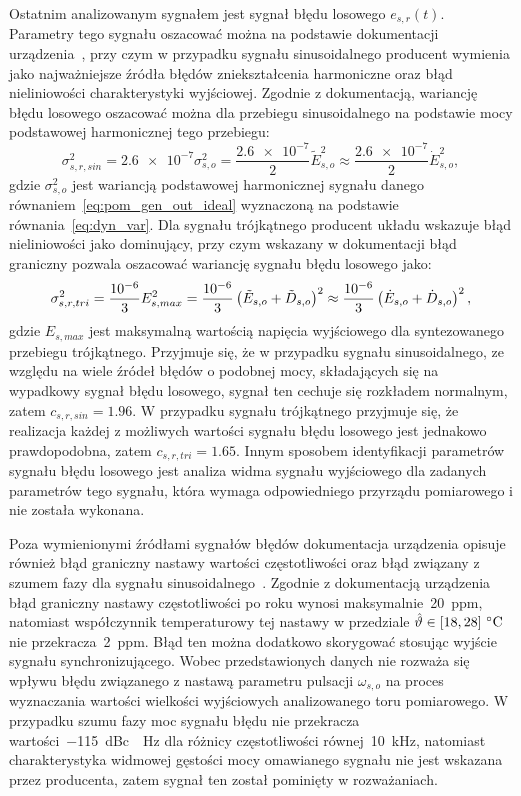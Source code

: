 Ostatnim analizowanym sygnałem jest sygnał błędu losowego $e_{s,r}(t)$. Parametry tego sygnału oszacować można na podstawie dokumentacji urządzenia~\cite{rigol_fawg}, przy czym w przypadku sygnału sinusoidalnego producent wymienia jako najważniejsze źródła błędów zniekształcenia harmoniczne oraz błąd nieliniowości charakterystyki wyjściowej. Zgodnie z dokumentacją, wariancję błędu losowego oszacować można dla przebiegu sinusoidalnego na podstawie mocy podstawowej harmonicznej tego przebiegu:
\begin{equation}
\sigma_{s,r,sin}^{2} = \num{2.6e-7} \sigma_{s,o}^{2} = \frac{\num{2.6e-7}}{2} \tilde{E}_{s,o}^{2} \approx \frac{\num{2.6e-7}}{2} \dot{E}_{s,o}^{2} \label{eq:pom_gen_var_rand_sin},
\end{equation}
gdzie $\sigma_{s,o}^{2}$ jest wariancją podstawowej harmonicznej sygnału danego równaniem~\eqref{eq:pom_gen_out_ideal} wyznaczoną na podstawie równania~\eqref{eq:dyn_var}. Dla sygnału trójkątnego producent układu wskazuje błąd nieliniowości jako dominujący, przy czym wskazany w dokumentacji błąd graniczny pozwala oszacować wariancję sygnału błędu losowego jako:
\begin{equation}
\sigma_{s,r,tri}^{2} = \frac{\num{e-6}}{3} E_{s,max}^{2} = \frac{\num{e-6}}{3} \left(\tilde{E}_{s,o} + \tilde{D}_{s,o}\right)^{2} \approx \frac{\num{e-6}}{3} \left(\dot{E}_{s,o} + \dot{D}_{s,o}\right)^{2} \label{eq:pom_gen_var_rand_saw},
\end{equation}
gdzie $E_{s,max}$ jest maksymalną wartością napięcia wyjściowego dla syntezowanego przebiegu trójkątnego. Przyjmuje się, że w przypadku sygnału sinusoidalnego, ze względu na wiele źródeł błędów o podobnej mocy, składających się na wypadkowy sygnał błędu losowego, sygnał ten cechuje się rozkładem normalnym, zatem $c_{s,r,sin} = \num{1.96}$. W przypadku sygnału trójkątnego przyjmuje się, że realizacja każdej z możliwych wartości sygnału błędu losowego jest jednakowo prawdopodobna, zatem $c_{s,r,tri} = \num{1.65}$. Innym sposobem identyfikacji parametrów sygnału błędu losowego jest analiza widma sygnału wyjściowego dla zadanych parametrów tego sygnału, która wymaga odpowiedniego przyrządu pomiarowego i nie została wykonana.

Poza wymienionymi źródłami sygnałów błędów dokumentacja urządzenia opisuje również błąd graniczny nastawy wartości częstotliwości oraz błąd związany z szumem fazy dla sygnału sinusoidalnego~\cite{rigol_fawg}. Zgodnie z dokumentacją urządzenia błąd graniczny nastawy częstotliwości po roku wynosi maksymalnie~\qty{20}{ppm}, natomiast współczynnik temperaturowy tej nastawy w przedziale $\hat{\vartheta} \in \interval{18}{28}~\unit{\degreeCelsius}$ nie przekracza~\qty{2}{ppm}. Błąd ten można dodatkowo skorygować stosując wyjście sygnału synchronizującego. Wobec przedstawionych danych nie rozważa się wpływu błędu związanego z nastawą parametru pulsacji $\omega_{s,o}$ na proces wyznaczania wartości wielkości wyjściowych analizowanego toru pomiarowego. W przypadku szumu fazy moc sygnału błędu nie przekracza wartości~\qty{-115}{dBc \per Hz} dla różnicy częstotliwości równej~\qty{10}{kHz}, natomiast charakterystyka widmowej gęstości mocy omawianego sygnału nie jest wskazana przez producenta, zatem sygnał ten został pominięty w rozważaniach.

